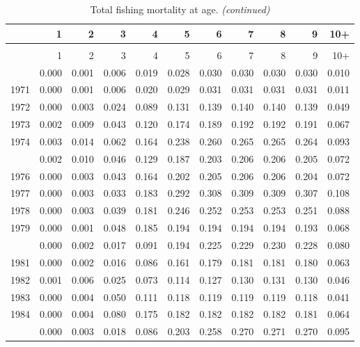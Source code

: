 \documentclass[
]{article}
\begin{document}
\begin{longtable}[t]{lrrrrrrrrrr}
\caption{\label{tab:FAA-tot-table}Total fishing mortality at age.}\\
\toprule
  & 1 & 2 & 3 & 4 & 5 & 6 & 7 & 8 & 9 & 10+\\
\midrule
\endfirsthead
\caption[]{Total fishing mortality at age. \textit{(continued)}}\\
\toprule
  & 1 & 2 & 3 & 4 & 5 & 6 & 7 & 8 & 9 & 10+\\
\midrule
\endhead

\endfoot
\bottomrule
\endlastfoot
1970 & 0.000 & 0.001 & 0.006 & 0.019 & 0.028 & 0.030 & 0.030 & 0.030 & 0.030 & 0.010\\
1971 & 0.000 & 0.001 & 0.006 & 0.020 & 0.029 & 0.031 & 0.031 & 0.031 & 0.031 & 0.011\\
1972 & 0.000 & 0.003 & 0.024 & 0.089 & 0.131 & 0.139 & 0.140 & 0.140 & 0.139 & 0.049\\
1973 & 0.002 & 0.009 & 0.043 & 0.120 & 0.174 & 0.189 & 0.192 & 0.192 & 0.191 & 0.067\\
1974 & 0.003 & 0.014 & 0.062 & 0.164 & 0.238 & 0.260 & 0.265 & 0.265 & 0.264 & 0.093\\
\addlinespace
1975 & 0.002 & 0.010 & 0.046 & 0.129 & 0.187 & 0.203 & 0.206 & 0.206 & 0.205 & 0.072\\
1976 & 0.000 & 0.003 & 0.043 & 0.164 & 0.202 & 0.205 & 0.206 & 0.206 & 0.204 & 0.072\\
1977 & 0.000 & 0.003 & 0.033 & 0.183 & 0.292 & 0.308 & 0.309 & 0.309 & 0.307 & 0.108\\
1978 & 0.000 & 0.003 & 0.039 & 0.181 & 0.246 & 0.252 & 0.253 & 0.253 & 0.251 & 0.088\\
1979 & 0.000 & 0.001 & 0.048 & 0.185 & 0.194 & 0.194 & 0.194 & 0.194 & 0.193 & 0.068\\
\addlinespace
1980 & 0.000 & 0.002 & 0.017 & 0.091 & 0.194 & 0.225 & 0.229 & 0.230 & 0.228 & 0.080\\
1981 & 0.000 & 0.002 & 0.016 & 0.086 & 0.161 & 0.179 & 0.181 & 0.181 & 0.180 & 0.063\\
1982 & 0.001 & 0.006 & 0.025 & 0.073 & 0.114 & 0.127 & 0.130 & 0.131 & 0.130 & 0.046\\
1983 & 0.000 & 0.004 & 0.050 & 0.111 & 0.118 & 0.119 & 0.119 & 0.119 & 0.118 & 0.041\\
1984 & 0.000 & 0.004 & 0.080 & 0.175 & 0.182 & 0.182 & 0.182 & 0.182 & 0.181 & 0.064\\
\addlinespace
1985 & 0.000 & 0.003 & 0.018 & 0.086 & 0.203 & 0.258 & 0.270 & 0.271 & 0.270 & 0.095\\

\end{longtable}
\end{document}
